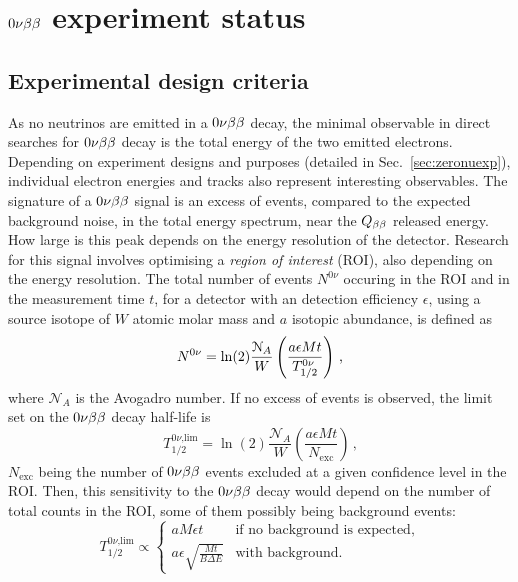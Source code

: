 \chapter{$0\nu\beta\beta$ experiment status}
\section{Experimental design criteria}

As no neutrinos are emitted in a $0\nu\beta\beta$ decay, the minimal observable in direct searches for $0\nu\beta\beta$ decay is the total energy of the two emitted electrons.
Depending on experiment designs and purposes (detailed in Sec.~\ref{sec:zeronuexp}), individual electron energies and tracks also represent interesting observables.
The signature of a $0\nu\beta\beta$ signal is an excess of events, compared to the expected background noise, in the total energy spectrum, near the $Q_{\beta\beta}$ released energy.
How large is this peak depends on the energy resolution of the detector.
Research for this signal involves optimising a \emph{region of interest} (ROI), also depending on the energy resolution.
The total number of events $N^{0\nu}$ occuring in the ROI and in the measurement time $t$, for a detector with an detection efficiency $\epsilon$, using a source isotope of $W$ atomic molar mass and $a$ isotopic abundance, is defined as
\begin{equation}
  N^{0\nu}=\ln(2)\frac{\mathcal{N}_{A}}{W}\left(\frac{a\epsilon M t}{T_{1/2}^{0\nu}}\right)\,\text{,}
  \label{eq:Nevents}
\end{equation}
where $\mathcal{N}_{A}$ is the Avogadro number.
If no excess of events is observed, the limit set on the $0\nu\beta\beta$ decay half-life is
\begin{equation}
  T_{1/2}^{0\nu\text{,lim}}=\ln(2)\frac{\mathcal{N}_{A}}{W}\left(\frac{a\epsilon M t}{N_{\text{exc}}}\right)\,\text{,}
  \label{eq:Tlim}
\end{equation}
$N_{\text{exc}}$ being the number of $0\nu\beta\beta$ events excluded at a given confidence level in the ROI.
Then, this sensitivity to the $0\nu\beta\beta$ decay would depend on the number of total counts in the ROI, some of them possibly being background events:
\begin{equation}
  T_{1/2}^{0\nu\text{,lim}} \propto \left\{
  \begin{array}{ll}
    a M \epsilon t & \text{if no background is expected,} \\
    a \epsilon \sqrt{\frac{M t}{B \Delta E}} & \text{with background.}
  \end{array}
  \right.
  \label{eq:sensitivity_background}
\end{equation}
